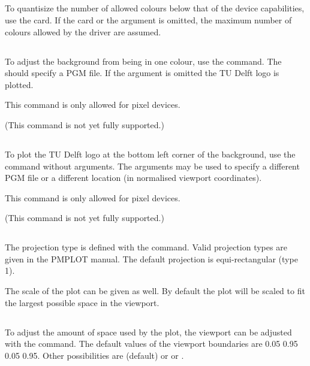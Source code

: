 \subsection{}
To quantisize the number of allowed colours below that of the device
capabilities, use the  card. If the card or
the  argument is omitted, the maximum number of colours
allowed by the driver are assumed.

\subsection{}
To adjust the background from being in one colour, use the
 command. The  should specify a PGM
file. If the argument is omitted the TU Delft logo is plotted.

This command is only allowed for pixel devices.

(This command is not yet fully supported.)

\subsection{}
To plot the TU Delft logo at the bottom left corner of the background,
use the  command without arguments. The arguments
 may be used to specify a different PGM file or
a different location (in normalised viewport coordinates).

This command is only allowed for pixel devices.

(This command is not yet fully supported.)

\subsection{}
The projection type is defined with the  command.
Valid projection types are given in the PMPLOT manual.
The default projection is equi-rectangular (type 1).

The scale of the
plot can be given as well. By default the plot will be scaled to fit the
largest possible space in the viewport.

\subsection{}
To adjust the amount of space used by the plot, the viewport can be
adjusted with the  command. The default values of the
viewport boundaries  are 0.05 0.95 0.05 0.95.
Other possibilities are  (default) or
 or .

